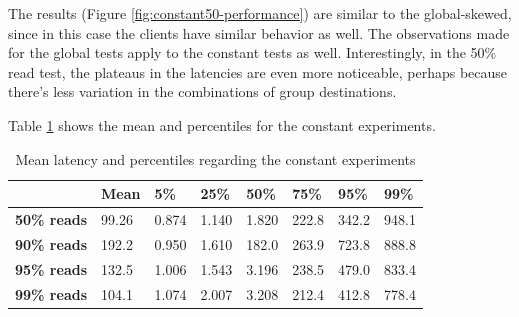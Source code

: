 The results (Figure \ref{fig:constant50-performance}) are similar to the global-skewed, since in this case the clients have similar behavior as well. The observations made for the global tests apply to the constant tests as well. Interestingly, in the 50\% read test, the plateaus in the latencies are even more noticeable, perhaps because there's less variation in the combinations of group destinations.

Table \ref{tab:constant-latencies-table} shows the mean and percentiles for the constant experiments.

\begin{table}[!htb]
  \centering
  \begin{tabular}{l l l l l l l l}
    \hline
    & \textbf{Mean} & \textbf{5\%} & \textbf{25\%} & \textbf{50\%} & \textbf{75\%} & \textbf{95\%}& \textbf{99\%} \\
    \hline
    \textbf{50\% reads} & 99.26 & 0.874 & 1.140 & 1.820 & 222.8 & 342.2 & 948.1 \\
    \textbf{90\% reads} & 192.2 & 0.950 & 1.610 & 182.0 & 263.9 & 723.8 & 888.8 \\
    \textbf{95\% reads} & 132.5 & 1.006 & 1.543 & 3.196 & 238.5 & 479.0 & 833.4 \\
    \textbf{99\% reads} & 104.1 & 1.074 & 2.007 & 3.208 & 212.4 & 412.8 & 778.4 \\
    \hline
  \end{tabular}
  \caption{Mean latency and percentiles regarding the constant experiments}\label{tab:constant-latencies-table}
\end{table}


